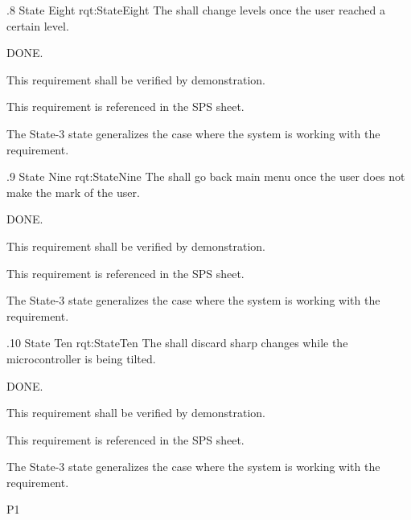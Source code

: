 \ONERQMTV
{\RqtNumberBase.8}
{State Eight}
{rqt:StateEight}
{The \ThisSys shall change levels once the user reached a certain level.}
{
	\item [Phase 1] DONE.

}
{This requirement shall be verified by demonstration.}
{
	\item [SPS] This requirement is referenced in the SPS sheet.
}
{
	\item The State-3 state generalizes the case where the system is working with the requirement.
}


\ONERQMTV
{\RqtNumberBase.9}
{State Nine}
{rqt:StateNine}
{The \ThisSys shall go back main menu once the user does not make the mark of the user.}
{
	\item [Phase 1] DONE.

}
{This requirement shall be verified by demonstration.}
{
	\item [SPS] This requirement is referenced in the SPS sheet.
}
{
	\item The State-3 state generalizes the case where the system is working with the requirement.
}


\ONERQMTV
{\RqtNumberBase.10}
{State Ten}
{rqt:StateTen}
{The \ThisSys shall discard sharp changes while the microcontroller is being tilted.}
{
	\item [Phase 1] DONE.

}
{This requirement shall be verified by demonstration.}
{
	\item [SPS] This requirement is referenced in the SPS sheet.
}
{
	\item The State-3 state generalizes the case where the system is working with the requirement.
}
{P1}

